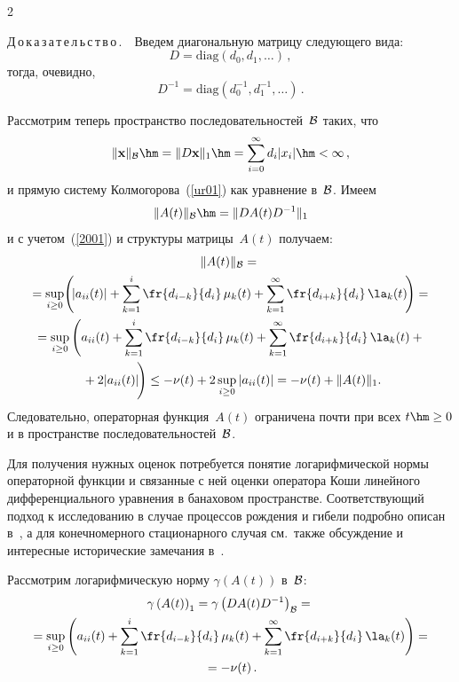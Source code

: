 \begin{multicols}{2}
\medskip

\noindent
Д\,о\,к\,а\,з\,а\,т\,е\,л\,ь\,с\,т\,в\,о\,.\ \
Введем диагональную матрицу следующего вида:
\begin{equation*}
D= \mathrm{diag} \left(d_0, d_1, \dots \right) \,, 
\end{equation*}
тогда, очевидно,
\begin{equation*}
D^{-1}= \mathrm{diag} \left(d_0^{-1}, d_1^{-1}, \dots \right)\,.  
\end{equation*}

Рассмотрим теперь пространство последовательностей~$\cal B$ 
таких, что 
$$
\|{\bf x}\|_{\cal B} \hm= \|D{\bf x}\|_{1} \hm= \sum\limits_{i=0}^{\infty} d_i
|x_i| \hm< \infty\,,
$$
и прямую систему Колмогорова~(\ref{ur01}) как
уравнение в~$\cal B$. Имеем 
$$
\|A(t)\|_{\cal B} \hm= \|DA(t)D^{-1}\|_{1}
$$ 
и с учетом~(\ref{2001}) и структуры матрицы~$A(t)$ получаем:
\begin{multline*}
\|A(t)\|_{\cal B} ={}\\
{}= \sup\limits_{i \ge 0} \!\left(\! |a_{ii}(t)| +
\sum\limits_{k=1}^{i}\fr{d_{i-k}}{d_i}\,\mu_k(t) + 
\sum\limits_{k=1}^{\infty} \fr{d_{i+k}}{d_i}\,\la_{k}(t)
 \!\right) = {}\\
 {}
= \sup\limits_{i \ge 0} \left( a_{ii}(t) +
\sum\limits_{k=1}^{i}\fr{d_{i-k}}{d_i}\,\mu_k(t) + \sum\limits_{k=1}^{\infty} 
\fr{d_{i+k}}{d_i}\,\la_{k}(t) +{}\right.\\
\hspace*{-6pt}\left.{}+ 2|a_{ii}(t)|
\vphantom{\sum\limits_{k=1}^\infty}\! \right) 
 \le -\nu(t) + 2 \sup\limits_{i \ge 0} \left| a_{ii}(t) \right| = 
 -\nu(t)+\|A(t)\|_{1}.\hspace*{-7.18808pt}
\end{multline*}
Следовательно, операторная функция~$A(t)$ ограничена почти при всех $t \hm\ge 0$ и в пространстве
последовательностей~$\cal B$.

Для получения нужных оценок потребуется понятие логарифмической
нормы операторной функции и связанные с ней оценки оператора Коши
линейного дифференциального уравнения в банаховом пространстве.
Соответствующий подход к исследованию в случае процессов рождения и
гибели подробно описан в~\cite{z95, z08b}, а для конечномерного
стационарного случая см.\ также обсуждение и интересные исторические
замечания в~\cite{dzp}.

Рассмотрим логарифмическую норму
$\gamma \left(A(t)\right)$ в~$\cal B$:
\begin{multline*}
\gamma \left(A(t)\right)_{1} = 
\gamma \left(DA(t)D^{-1}\right)_{\cal B} = {} \\ 
{}=  \sup\limits_{i \ge 0} \left( a_{ii}(t) +\sum\limits_{k=1}^{i}\fr{d_{i-k}}{d_i}\,\mu_k(t) 
+ \sum\limits_{k=1}^{\infty} \fr{d_{i+k}}{d_i}\,\la_{k}(t)  \right) ={}\\
{}= - \nu (t)\,. 
\end{multline*}


\end{multicols}

